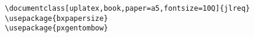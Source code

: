 \documentclass[uplatex,book,paper=a5,fontsize=10Q]{jlreq}
\begin{document}
\begin{verbatim}
\documentclass[uplatex,book,paper=a5,fontsize=10Q]{jlreq}
\usepackage{bxpapersize}
\usepackage{pxgentombow}
\end{verbatim}
\end{document}
